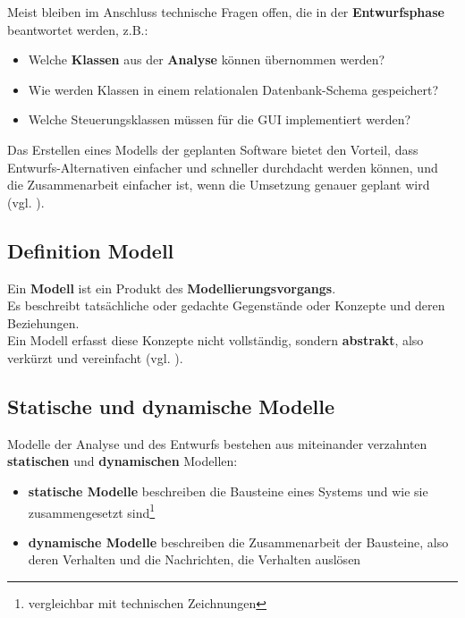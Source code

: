 \noindent
Meist bleiben im Anschluss technische Fragen offen, die in der \textbf{Entwurfsphase} beantwortet werden, z.B.:

\begin{itemize}
    \item Welche \textbf{Klassen} aus der \textbf{Analyse} können übernommen werden?
    \item Wie werden Klassen in einem relationalen Datenbank-Schema gespeichert?
    \item Welche Steuerungsklassen müssen für die GUI implementiert werden?
\end{itemize}

\noindent
Das Erstellen eines Modells der geplanten Software bietet den Vorteil, dass Entwurfs-Alternativen einfacher und schneller durchdacht werden können, und die Zusammenarbeit einfacher ist, wenn die Umsetzung genauer geplant wird (vgl. \cite[2]{Wed09b}).


\subsection*{Definition Modell}


\vspace{2mm}
\begin{tcolorbox}[title=Arbeitsdefinition ``Modell``]
    Ein \textbf{Modell} ist ein Produkt des \textbf{Modellierungsvorgangs}.\\

    \noindent
    Es beschreibt tatsächliche oder gedachte Gegenstände oder Konzepte und deren Beziehungen.\\

    \noindent
    Ein Modell erfasst diese Konzepte nicht vollständig, sondern \textbf{abstrakt}, also verkürzt und vereinfacht (vgl. \cite[2]{Wed09b}).
\end{tcolorbox}
\vspace{2mm}

\subsection*{Statische und dynamische Modelle}

\noindent
Modelle der Analyse und des Entwurfs bestehen aus miteinander verzahnten \textbf{statischen} und \textbf{dynamischen} Modellen:

\begin{itemize}
    \item \textbf{statische Modelle} beschreiben die Bausteine eines Systems und wie sie zusammengesetzt sind\footnote{vergleichbar mit technischen Zeichnungen}
    \item \textbf{dynamische Modelle} beschreiben die Zusammenarbeit der Bausteine, also deren Verhalten und die Nachrichten, die Verhalten auslösen
\end{itemize}

